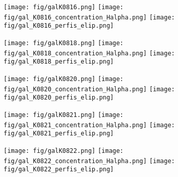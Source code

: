 \begin{figure}[!ht]
\begin{center}
\setcaptionmargin{1cm}
\texttt{[image: fig/galK0816.png]}
\texttt{[image: fig/gal\_K0816\_concentration\_Halpha.png]}
\texttt{[image: fig/gal\_K0816\_perfis\_elip.png]}
\end{center}
\end{figure}


\begin{figure}[!ht]
\begin{center}
\setcaptionmargin{1cm}
\texttt{[image: fig/galK0818.png]}
\texttt{[image: fig/gal\_K0818\_concentration\_Halpha.png]}
\texttt{[image: fig/gal\_K0818\_perfis\_elip.png]}
\end{center}
\end{figure}


\begin{figure}[!ht]
\begin{center}
\setcaptionmargin{1cm}
\texttt{[image: fig/galK0820.png]}
\texttt{[image: fig/gal\_K0820\_concentration\_Halpha.png]}
\texttt{[image: fig/gal\_K0820\_perfis\_elip.png]}
\end{center}
\end{figure}


\begin{figure}[!ht]
\begin{center}
\setcaptionmargin{1cm}
\texttt{[image: fig/galK0821.png]}
\texttt{[image: fig/gal\_K0821\_concentration\_Halpha.png]}
\texttt{[image: fig/gal\_K0821\_perfis\_elip.png]}
\end{center}
\end{figure}


\begin{figure}[!ht]
\begin{center}
\setcaptionmargin{1cm}
\texttt{[image: fig/galK0822.png]}
\texttt{[image: fig/gal\_K0822\_concentration\_Halpha.png]}
\texttt{[image: fig/gal\_K0822\_perfis\_elip.png]}
\end{center}
\end{figure}


